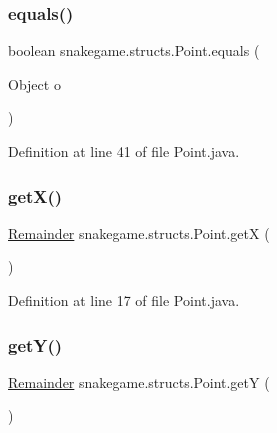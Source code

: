 \mbox{\label{classsnakegame_1_1structs_1_1_point_a46a08a1ffaa9cf65bab5527e620c0127}} 
\subsubsection{\texorpdfstring{equals()}{equals()}}
{\footnotesize\ttfamily boolean snakegame.\+structs.\+Point.\+equals (\begin{DoxyParamCaption}\item[{Object}]{o }\end{DoxyParamCaption})}



Definition at line 41 of file Point.\+java.

\mbox{\label{classsnakegame_1_1structs_1_1_point_a6dd8ef89102d12ec0cf5db0c03a568eb}} 
\subsubsection{\texorpdfstring{get\+X()}{getX()}}
{\footnotesize\ttfamily \mbox{\hyperlink{classsnakegame_1_1structs_1_1_remainder}{Remainder}} snakegame.\+structs.\+Point.\+getX (\begin{DoxyParamCaption}{ }\end{DoxyParamCaption})}



Definition at line 17 of file Point.\+java.

\mbox{\label{classsnakegame_1_1structs_1_1_point_a920963cbc293b477335d7dc931ffb306}} 
\subsubsection{\texorpdfstring{get\+Y()}{getY()}}
{\footnotesize\ttfamily \mbox{\hyperlink{classsnakegame_1_1structs_1_1_remainder}{Remainder}} snakegame.\+structs.\+Point.\+getY (\begin{DoxyParamCaption}{ }\end{DoxyParamCaption})}



